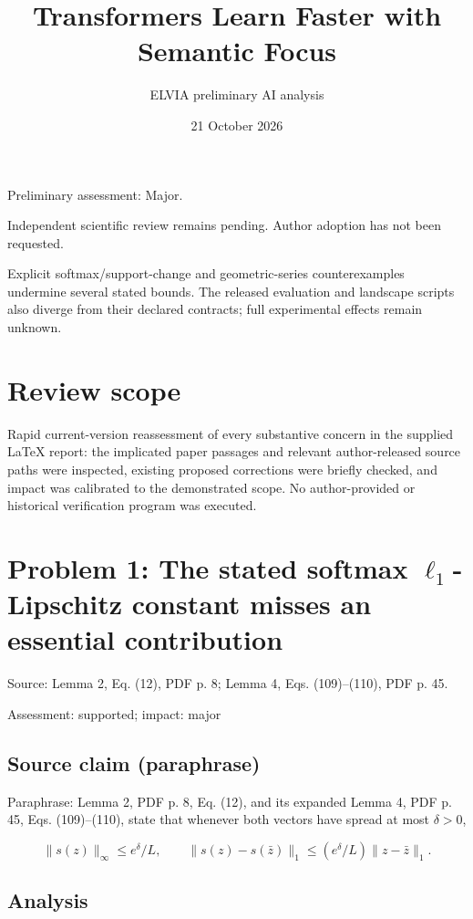 \documentclass[11pt]{article}
\begin{document}
\title{Transformers Learn Faster with Semantic Focus}

\author{ELVIA preliminary AI analysis}\date{21 October 2026}\maketitle

Preliminary assessment: Major.\par

Independent scientific review remains pending. Author adoption has not been requested.

Explicit softmax/support-change and geometric-series counterexamples undermine several stated bounds. The released evaluation and landscape scripts also diverge from their declared contracts; full experimental effects remain unknown.

\section*{Review scope}

Rapid current-version reassessment of every substantive concern in the supplied LaTeX report: the implicated paper passages and relevant author-released source paths were inspected, existing proposed corrections were briefly checked, and impact was calibrated to the demonstrated scope. No author-provided or historical verification program was executed.

\section*{Problem 1: The stated softmax \(\ell_1\)-Lipschitz constant misses an essential contribution}

Source: Lemma 2, Eq. (12), PDF p. 8; Lemma 4, Eqs. (109)–(110), PDF p. 45.

Assessment: supported; impact: major

\subsection*{Source claim (paraphrase)}

Paraphrase: Lemma 2, PDF p. 8, Eq. (12), and its expanded Lemma 4, PDF p. 45, Eqs. (109)–(110), state that whenever both vectors have spread at most \(\delta>0\),

\[ \|s(z)\|_\infty\le e^\delta/L, \qquad \|s(z)-s(\bar z)\|_1\le(e^\delta/L)\|z-\bar z\|_1. \]

\subsection*{Analysis}
\end{document}
